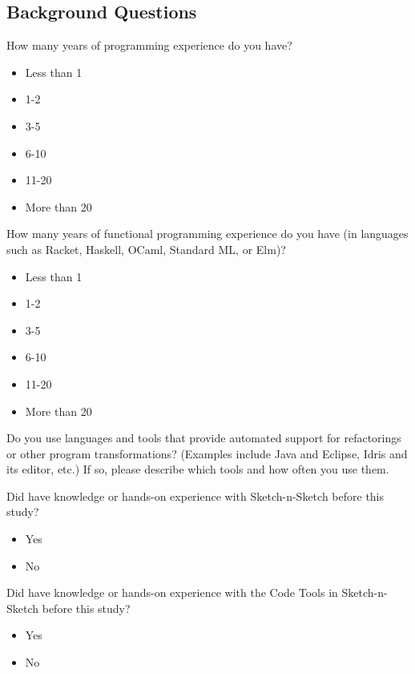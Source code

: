 \setlength{\parindent}{0em}
\setlength{\parskip}{1em}


\subsection*{Background Questions}

How many years of programming experience do you have?

\begin{itemize}
  \item Less than 1
  \item 1-2
  \item 3-5
  \item 6-10
  \item 11-20
  \item More than 20
\end{itemize}

How many years of functional programming experience do you have
(in languages such as Racket, Haskell, OCaml, Standard ML, or Elm)?

\begin{itemize}
  \item Less than 1
  \item 1-2
  \item 3-5
  \item 6-10
  \item 11-20
  \item More than 20
\end{itemize}


Do you use languages and tools that provide automated support
for refactorings or other program transformations?
(Examples include Java and Eclipse, Idris and its editor, etc.)
If so, please describe which tools and how often you use them.


Did have knowledge or hands-on experience with Sketch-n-Sketch
before this study?

\begin{itemize}
  \item Yes
  \item No
\end{itemize}

Did have knowledge or hands-on experience with the
Code Tools in Sketch-n-Sketch before this study?

\begin{itemize}
  \item Yes
  \item No
\end{itemize}

